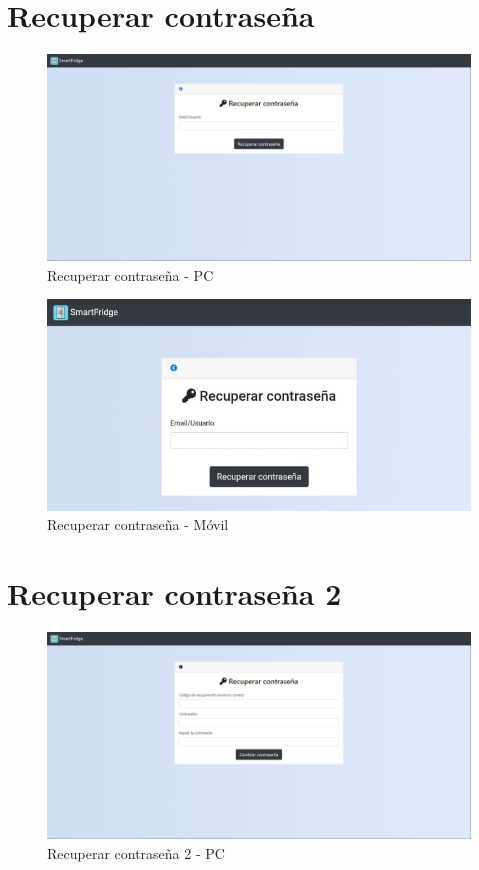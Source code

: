 \newpage
\section{Recuperar contraseña}
\begin{figure}[h] 
    \centering
    \includegraphics[width=.90\textwidth]{capitulos/anexotres/PC/Forget.png}
    \caption{Recuperar contraseña - PC}
    \label{fig:forgetpc}
\end{figure}

\begin{figure}[h] 
    \centering
    \includegraphics[width=.50\textwidth]{capitulos/anexotres/Phone/Forget.jpeg}
    \caption{Recuperar contraseña - Móvil}
    \label{fig:forgetphone}
\end{figure}

\newpage
\section{Recuperar contraseña 2}
\begin{figure}[h] 
    \centering
    \includegraphics[width=.90\textwidth]{capitulos/anexotres/PC/Recover.png}
    \caption{Recuperar contraseña 2 - PC}
    \label{fig:recovepcr}
\end{figure}

